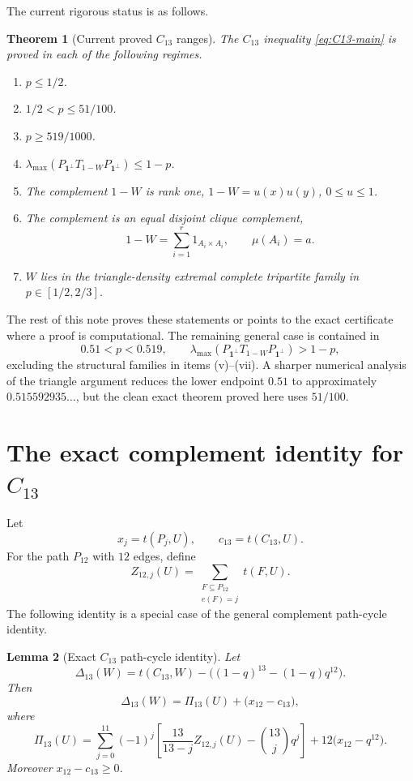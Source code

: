 \documentclass[11pt]{article}
\newtheorem{theorem}{Theorem}[section]
\newtheorem{lemma}[theorem]{Lemma}
\newcommand{\one}{\mathbf 1}
\begin{document}
The current rigorous status is as follows.

\begin{theorem}[Current proved $C_{13}$ ranges]\label{thm:status}
The $C_{13}$ inequality \eqref{eq:C13-main} is proved in each of the following
regimes.
\begin{enumerate}[label=(\roman*),leftmargin=2em]
\item $p\le1/2$.
\item $1/2<p\le 51/100$.
\item $p\ge 519/1000$.
\item $\lambda_{\max}(P_{\one^\perp}T_{1-W}P_{\one^\perp})\le 1-p$.
\item The complement $1-W$ is rank one, $1-W=u(x)u(y)$, $0\le u\le1$.
\item The complement is an equal disjoint clique complement,
\[
        1-W=\sum_{i=1}^r 1_{A_i\times A_i},\qquad \mu(A_i)=a.
\]
\item $W$ lies in the triangle-density extremal complete tripartite family in
$p\in[1/2,2/3]$.
\end{enumerate}
\end{theorem}

The rest of this note proves these statements or points to the exact certificate
where a proof is computational.  The remaining general case is contained in
\begin{equation}\label{eq:remaining-strip}
        0.51<p<0.519,
        \qquad
        \lambda_{\max}(P_{\one^\perp}T_{1-W}P_{\one^\perp})>1-p,
\end{equation}
excluding the structural families in items (v)--(vii).  A sharper numerical
analysis of the triangle argument reduces the lower endpoint $0.51$ to
approximately $0.515592935\ldots$, but the clean exact theorem proved here uses
$51/100$.

\section{The exact complement identity for $C_{13}$}

Let
\[
        x_j=t(P_j,U),\qquad c_{13}=t(C_{13},U).
\]
For the path $P_{12}$ with $12$ edges, define
\[
        Z_{12,j}(U)=\sum_{\substack{F\subseteq P_{12}\\ e(F)=j}}t(F,U).
\]
The following identity is a special case of the general complement path-cycle
identity.

\begin{lemma}[Exact $C_{13}$ path-cycle identity]\label{lem:exact-identity}
Let
\[
        \Delta_{13}(W)=t(C_{13},W)-\bigl((1-q)^{13}-(1-q)q^{12}\bigr).
\]
Then
\begin{equation}\label{eq:delta-Pi-correction}
        \Delta_{13}(W)=\Pi_{13}(U)+\bigl(x_{12}-c_{13}\bigr),
\end{equation}
where
\begin{equation}\label{eq:Pi13-def}
        \Pi_{13}(U)=
        \sum_{j=0}^{11}(-1)^j
        \left[
        \frac{13}{13-j}Z_{12,j}(U)-\binom{13}{j}q^j
        \right]
        +12\bigl(x_{12}-q^{12}\bigr).
\end{equation}
Moreover $x_{12}-c_{13}\ge0$.
\end{lemma}
\end{document}
